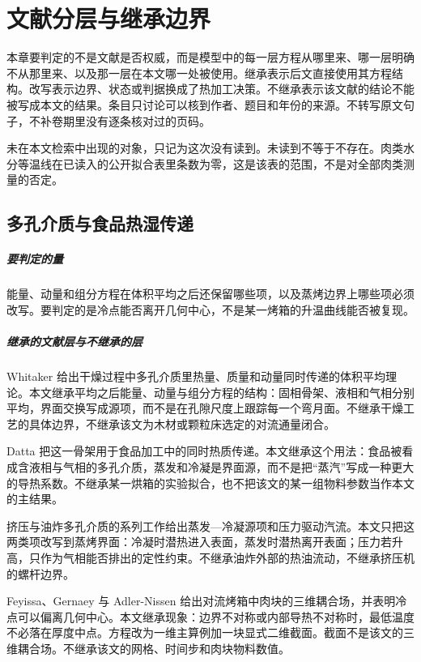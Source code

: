 \chapter{文献分层与继承边界}
\label{ch:lit}

本章要判定的不是文献是否权威，而是模型中的每一层方程从哪里来、哪一层明确不从那里来、以及那一层在本文哪一处被使用。继承表示后文直接使用其方程结构。改写表示边界、状态或判据换成了热加工决策。不继承表示该文献的结论不能被写成本文的结果。条目只讨论可以核到作者、题目和年份的来源。不转写原文句子，不补卷期里没有逐条核对过的页码。

未在本文检索中出现的对象，只记为这次没有读到。未读到不等于不存在。肉类水分等温线在已读入的公开拟合表里条数为零，这是该表的范围，不是对全部肉类测量的否定。

\section{多孔介质与食品热湿传递}

\paragraph{要判定的量}
能量、动量和组分方程在体积平均之后还保留哪些项，以及蒸烤边界上哪些项必须改写。要判定的是冷点能否离开几何中心，不是某一烤箱的升温曲线能否被复现。

\paragraph{继承的文献层与不继承的层}
Whitaker 给出干燥过程中多孔介质里热量、质量和动量同时传递的体积平均理论\cite{whitaker1977}。本文继承平均之后能量、动量与组分方程的结构：固相骨架、液相和气相分别平均，界面交换写成源项，而不是在孔隙尺度上跟踪每一个弯月面。不继承干燥工艺的具体边界，不继承该文为木材或颗粒床选定的对流通量闭合。

Datta 把这一骨架用于食品加工中的同时热质传递\cite{datta2007}。本文继承这个用法：食品被看成含液相与气相的多孔介质，蒸发和冷凝是界面源，而不是把“蒸汽”写成一种更大的导热系数。不继承某一烘箱的实验拟合，也不把该文的某一组物料参数当作本文的主结果。

挤压与油炸多孔介质的系列工作给出蒸发—冷凝源项和压力驱动汽流。本文只把这两类项改写到蒸烤界面：冷凝时潜热进入表面，蒸发时潜热离开表面；压力若升高，只作为气相能否排出的定性约束。不继承油炸外部的热油流动，不继承挤压机的螺杆边界。

Feyissa、Gernaey 与 Adler-Nissen 给出对流烤箱中肉块的三维耦合场，并表明冷点可以偏离几何中心\cite{feyissa2013}。本文继承现象：边界不对称或内部导热不对称时，最低温度不必落在厚度中点。方程改为一维主算例加一块显式二维截面。截面不是该文的三维耦合场。不继承该文的网格、时间步和肉块物料数值。

